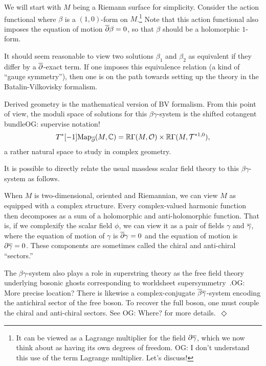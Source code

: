 \documentclass[11pt]{amsart}
\def\del{\partial}
\def\owen#1{{\textcolor{violet!50!black}{OG: {#1}}}}
\begin{document}
We will start with $M$ being a Riemann surface for simplicity.
Consider the action functional
\beqn
\label{eqn: 1d betagamma}
\int \beta \wedge \dbar \gamma
\eeqn
where $\beta$ is a $(1,0)$-form on $M$.\footnote{It can be viewed as a Lagrange multiplier for the field $\del \Bar{\gamma}$, 
which we now think about as having its own degrees of freedom. 
\owen{I don't understand this use of the term Lagrange multiplier. Let's discuss!}}
Note that this action functional also imposes the equation of motion $\dbar \beta = 0$,
so that $\beta$ should be a holomorphic $1$-form.

It should seem reasonable to view two solutions $\beta_1$ and $\beta_2$ as equivalent if they differ by a $\dbar$-exact term.
If one imposes this equivalence relation (a kind of ``gauge symmetry''),
then one is on the path towards setting up the theory in the Batalin-Vilkovisky formalism.

Derived geometry is the mathematical version of BV formalism.
From this point of view, the moduli space of solutions for this $\beta\gamma$-system is the shifted cotangent bundle\owen{supervise notation!}
\[
T^*[-1] \Map_\dbar(M,\CC) = \RR\Gamma(M,\cO) \times \RR\Gamma(M,\cT^{*{1,0}}),
\]
a rather natural space to study in complex geometry.

\begin{rmk}
It is possible to directly relate the usual massless scalar field theory to this $\beta\gamma$-system as follows.

When $M$ is two-dimensional, oriented and Riemannian,
we can view $M$ as equipped with a complex structure.
Every complex-valued harmonic function then decomposes as a sum of a holomorphic and anti-holomorphic function. 
That is, if we complexify the scalar field $\phi$, 
we can view it as a pair of fields $\gamma$ and $\Bar{\gamma}$,
where the equation of motion of $\gamma$ is $\dbar \gamma = 0$ and the equation of motion is $\partial \Bar{\gamma} = 0$.
These components are sometimes called the chiral and anti-chiral ``sectors.'' 

The $\beta\gamma$-system also plays a role in superstring theory as the free field theory underlying bosonic ghosts corresponding to worldsheet supersymmetry~\cite{Polchinski}.\owen{More precise location?}
There is likewise a complex-conjugate $\Bar{\beta}\Bar{\gamma}$-system encoding the antichiral sector of the free boson.
To recover the full boson, one must couple the chiral and anti-chiral sectors.
See \cite{Kapustin,GGW} \owen{Where?} for more details.~\hfill$\Diamond$
\end{rmk}
\end{document}
